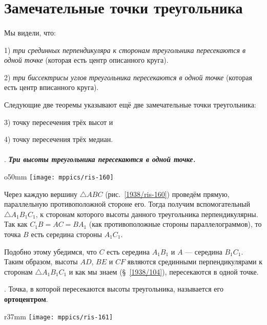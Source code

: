 \section{Замечательные точки треугольника}

\paragraph{}\label{1938/141}
Мы видели, что:

1) \emph{три срединных перпендикуляра к сторонам треугольника пересекаются в одной точке} (которая есть центр описанного круга). 

2) \emph{три биссектрисы углов треугольника пересекаются в одной точке} (которая есть центр вписанного круга).

Следующие две теоремы указывают ещё две замечательные точки треугольника:

3) точку пересечения трёх высот и 

4) точку пересечения трёх медиан.

\paragraph{}\label{1938/142}
.
\textbf{\emph{Три высоты треугольника пересекаются в одной точке.}}

\begin{wrapfigure}{o}{50mm}
\centering
\texttt{[image: mppics/ris-160]}
\caption{}\label{1938/ris-160}
\end{wrapfigure}

Через каждую вершину $\triangle ABC$ (рис.~\ref{1938/ris-160}) проведём прямую, параллельную противоположной стороне его.
Тогда получим вспомогательный $\triangle A_1B_1C_1$, к сторонам которого высоты данного треугольника перпендикулярны.
Так как $C_1B=AC=BA_1$ (как противоположные стороны параллелограммов), то точка $B$ есть середина стороны $A_1C_1$.

Подобно этому убедимся, что $C$ есть середина $A_1B_1$ и $A$ — середина $B_1C_1$.
Таким образом, высоты $AD$, $BE$ и $CF$ являются
срединными перпендикулярами к сторонам $\triangle A_1B_1C_1$ и как мы знаем (§~\ref{1938/104}), пересекаются в одной точке.

{\small
\smallskip
\mbox{.}
Точка, в которой пересекаются высоты треугольника, называется его \textbf{ортоцентром}.
}

\begin{wrapfigure}{r}{37mm}
\vskip-4mm
\centering
\texttt{[image: mppics/ris-161]}
\caption{}\label{1938/ris-161}
\end{wrapfigure}

